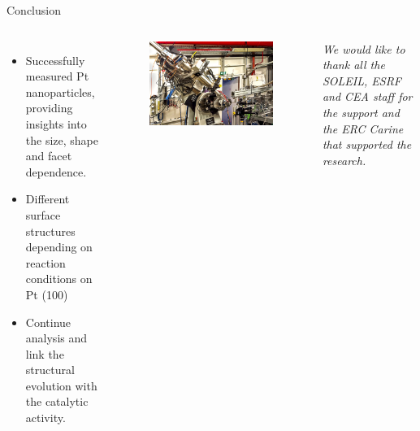 \begin{frame}{Conclusion}

    \begin{columns}
        \vspace{1cm}
        \begin{itemize}
            \item Successfully measured Pt nanoparticles, providing insights into the size, shape and facet dependence.
            \pause
            \vspace{0.4cm}
            \item Different surface structures depending on reaction conditions on Pt (100)
            \pause
            \vspace{0.4cm}
            \item Continue analysis and  link the structural evolution with the catalytic activity.
        \end{itemize}


        \pause
        \begin{figure}
            \centering
            \includegraphics[width=\textwidth]{Figures/sixs/MED.jpg}
        \end{figure}

        \vspace{0.5cm}
        \textit{We would like to thank all the SOLEIL, ESRF and CEA staff for the support and the ERC Carine that supported the research.}

    \end{columns}
\end{frame}
